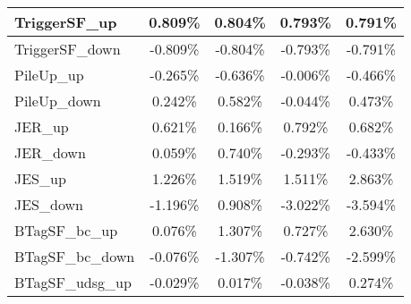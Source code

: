 \begin{table}[]
{\begin{tabular}{|l|c|c|c|c|}
TriggerSF\_up                               & 0.809\%                                & 0.804\%                                & 0.793\%                               & 0.791\%                                \\ \hline 
TriggerSF\_down                             & -0.809\%                              & -0.804\%                              & -0.793\%                             & -0.791\%                              \\ \hline 
PileUp\_up                             & -0.265\%                              & -0.636\%                              & -0.006\%                             & -0.466\%                              \\ \hline 
PileUp\_down                           & 0.242\%                            & 0.582\%                            & -0.044\%                           & 0.473\%                            \\ \hline 
JER\_up                         & 0.621\%                          & 0.166\%                          & 0.792\%                         & 0.682\%                          \\ \hline     
JER\_down                       & 0.059\%                        & 0.740\%                        & -0.293\%                       & -0.433\%                        \\ \hline    
JES\_up                                 & 1.226\%                                  & 1.519\%                                  & 1.511\%                                 & 2.863\%                                  \\ \hline    
JES\_down                               & -1.196\%                                & 0.908\%                                & -3.022\%                               & -3.594\%                                \\ \hline    
BTagSF\_bc\_up                              & 0.076\%                               & 1.307\%                               & 0.727\%                              & 2.630\%                               \\ \hline    
BTagSF\_bc\_down                            & -0.076\%                             & -1.307\%                             & -0.742\%                            & -2.599\%                             \\ \hline    
BTagSF\_udsg\_up                            & -0.029\%                             & 0.017\%                             & -0.038\%                            & 0.274\%                             \\ \hline     

\end{tabular}}
\end{table}
